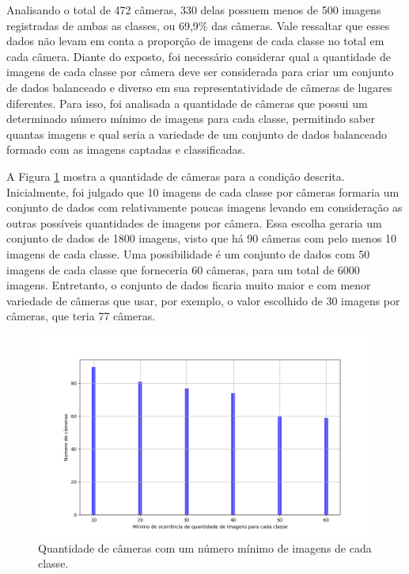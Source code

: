 Analisando o total de 472 câmeras, 330 delas possuem menos de 500 imagens registradas de ambas as classes, ou 69,9\% das câmeras.
Vale ressaltar que esses dados não levam em conta a proporção de imagens de cada classe no total em cada câmera.
Diante do exposto, foi necessário considerar qual a quantidade de imagens de cada classe por câmera deve ser considerada para criar um conjunto de dados balanceado e diverso em sua representatividade de câmeras de lugares diferentes. 
Para isso, foi analisada a quantidade de câmeras que possui um determinado número mínimo de imagens para cada classe, permitindo saber quantas imagens e qual seria a variedade de um conjunto de dados balanceado formado com as imagens captadas e classificadas.

A Figura \ref{fig:balancedcodes} mostra a quantidade de câmeras para a condição descrita. 
Inicialmente, foi julgado que 10 imagens de cada classe por câmeras formaria um conjunto de dados com relativamente poucas imagens levando em consideração as outras possíveis quantidades de imagens por câmera. 
Essa escolha geraria um conjunto de dados de 1800 imagens, visto que há 90 câmeras com pelo menos 10 imagens de cada classe. 
Uma possibilidade é um conjunto de dados com 50 imagens de cada classe que forneceria 60 câmeras, para um total de 6000 imagens. 
Entretanto, o conjunto de dados ficaria muito maior e com menor variedade de câmeras que usar, por exemplo, o valor escolhido de 30 imagens por câmeras, que teria 77 câmeras. 

\begin{figure}[htb]
\centerline{\includegraphics[width=1\linewidth]{images/balancedcodes.png}}
\caption{Quantidade de câmeras com um número mínimo de imagens de cada classe.}
\label{fig:balancedcodes}
\end{figure}

